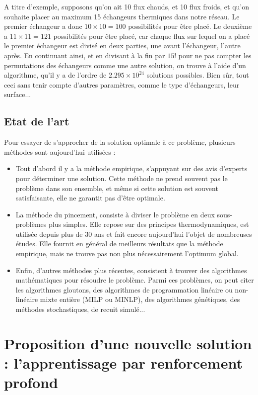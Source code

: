 A titre d'exemple, supposons qu'on ait 10 flux chauds, et 10 flux froids, et qu'on souhaite placer au maximum 15 échangeurs thermiques dans notre réseau. Le premier échangeur a donc $10 \times 10 = 100$ possibilités pour être placé. Le deuxième a $11 \times 11 = 121$ possibilités pour être placé, car chaque flux sur lequel on a placé le premier échangeur est divisé en deux parties,
une avant l'échangeur, l'autre après. En continuant ainsi, et en divisant à la fin par $15!$ pour ne pas compter les permutations des échangeurs comme une autre solution, on trouve à l'aide d'un
algorithme, qu'il y a de l'ordre de $2.295 \times 10^{24}$ solutions possibles. Bien sûr, tout ceci sans tenir
compte d'autres paramètres, comme le type d'échangeurs, leur surface...

\subsection{Etat de l'art}

Pour essayer de s'approcher de la solution optimale à ce problème, plusieurs méthodes sont aujourd'hui utilisées :
\begin{itemize}
\item Tout d'abord il y a la méthode empirique, s'appuyant sur des avis d'experts pour déterminer une solution. Cette méthode ne prend souvent pas le problème dans son ensemble, et même si cette solution est souvent satisfaisante, elle ne garantit pas d'être optimale.
\item La méthode du pincement, consiste à diviser le problème en deux sous-problèmes plus simples.
Elle repose sur des principes thermodynamiques, est utilisée depuis plus de 30 ans et fait encore aujourd'hui l'objet de nombreuses études. Elle fournit en général de meilleurs résultats que la méthode empirique, mais ne trouve pas non plus nécessairement l'optimum global.
\item Enfin, d'autres méthodes plus récentes, consistent à trouver des algorithmes mathématiques pour résoudre le problème. Parmi ces problèmes, on peut citer les algorithmes gloutons, des algorithmes de programmation linéaire ou non-linéaire mixte entière (MILP ou MINLP), des algorithmes génétiques, des méthodes stochastiques, de recuit simulé...
\end{itemize} 

\section{Proposition d'une nouvelle solution : l'apprentissage par renforcement profond}

